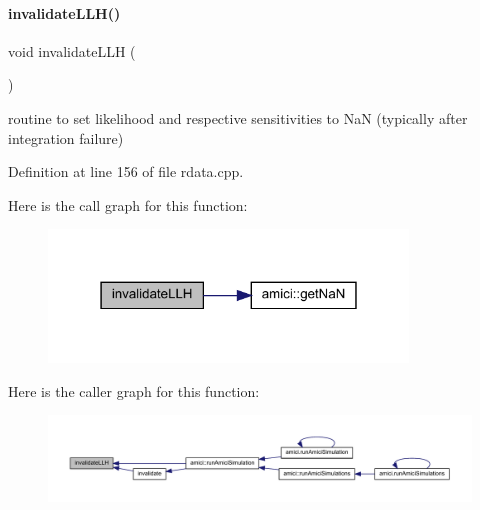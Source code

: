 \paragraph{\texorpdfstring{invalidate\+L\+L\+H()}{invalidateLLH()}}
{\footnotesize\ttfamily void invalidate\+L\+LH (\begin{DoxyParamCaption}{ }\end{DoxyParamCaption})}

routine to set likelihood and respective sensitivities to NaN (typically after integration failure)

Definition at line 156 of file rdata.\+cpp.

Here is the call graph for this function\+:
\nopagebreak
\begin{figure}[H]
\begin{center}
\leavevmode
\includegraphics[width=271pt]{classamici_1_1_return_data_a03e88745280c032d3b59fd7235665e17_cgraph}
\end{center}
\end{figure}
Here is the caller graph for this function\+:
\nopagebreak
\begin{figure}[H]
\begin{center}
\leavevmode
\includegraphics[width=350pt]{classamici_1_1_return_data_a03e88745280c032d3b59fd7235665e17_icgraph}
\end{center}
\end{figure}
\mbox{\label{classamici_1_1_return_data_adce202dc864a1e65d8453f597de271f5}} 
